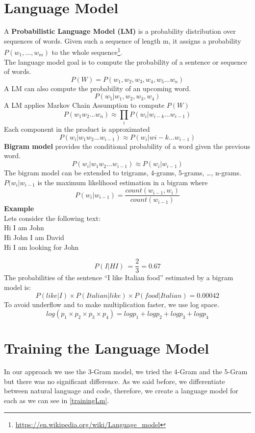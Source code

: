 \documentclass[12pt,mscthesis]{usiinfthesis}
\begin{document}
	\section{Language Model}

	A \textbf{Probabilistic Language Model (LM)} is a probability distribution over sequences of words. Given such a sequence of length m, it assigns a probability $P(w_{1},\ldots ,w_{m})$ to the whole sequence\footnote{\url{https://en.wikipedia.org/wiki/Language_model}}.\\
	The language model goal is to compute the probability of a sentence or sequence of words.
	\[P(W) = P(w_{1},w_2,w_3,w_4,w_5\dots w_n)\]
	A LM can also compute the probability of an upcoming word.
	\[P(w_5|w_1,w_2,w_3,w_4)\]
	A LM applies Markov Chain Assumption to compute $P(W)$
	\[P(w_1w_2\dots w_n) \approx \prod_{i} P(w_i|w_{i-k} \dots w_{i-1})\]
	Each component in the product is approximated
	\[P(w_i |w_1w_2\dots w_{i-1}) \approx P(w_i |w{i-k} \dots w_{i-1})\]
	\textbf{Bigram model} provides the conditional probability of a word given the previous word.
	\[P(w_i |w_1w_2 \dots w_{i-1})\approx P(w_i |w_{i-1})\]
	The bigram model can be extended to trigrams, 4-grams, 5-grams, \dots , n-grams.\\
	$P(w_i |w_{i-1}$ is the maximum likelihood estimation in a bigram where 
	\[P(w_{i}|w_{{i-1}})=\frac{count(w_{{i-1}},w_{i})} {count(w_{{i-1}})}\]
	\textbf{Example}\\
	Lets consider the following text:\\
	Hi I am John\\
	Hi John I am David\\
	Hi I am looking for John

	\[P(I|HI)\ = \frac{2}{3} = 0.67\]
	The probabilities of the sentence ``I like Italian food'' estimated by a bigram model is:
	\[P(like|I) \times P(Italian|like) \times P(food|Italian)= 0.00042\]
	To avoid underflow and to make multiplication faster, we use log space.
	\[log( p_1 \times p_2 \times p_3 \times p_4 ) = log p_1 + log p_2 + log p_3 + log p_4\]



	\section{Training the Language Model}
	In our approach we use the 3-Gram model, we tried the 4-Gram and the 5-Gram but there was no significant difference. As we said before, we differentiate between natural language and code, therefore, we create a language model for each as we can see in \cref{trainingLm}.\\
\end{document}
